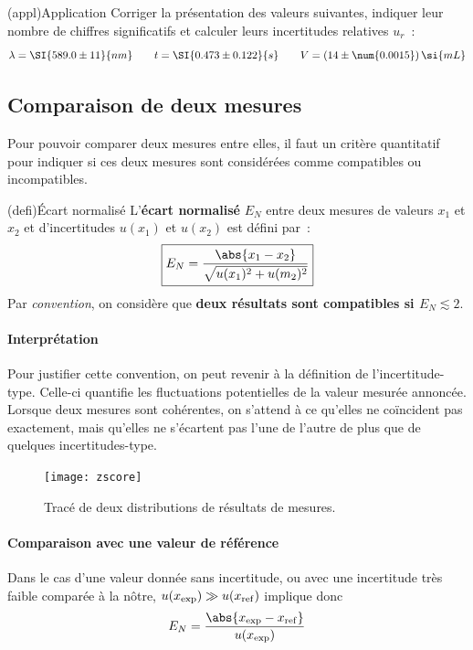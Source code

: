 \documentclass[../main/main.tex]{subfiles}
\begin{document}
\begin{tcb}(appl){Application}
	Corriger la présentation des valeurs suivantes, indiquer leur nombre de
	chiffres significatifs et calculer leurs incertitudes relatives $u_r$~:
	\[
		\lambda = \SI{589.0\pm11}{nm}
		\qquad
		t = \SI{0.473 \pm 0.122}{s}
		\qquad
		V = (14 \pm \num{0.0015})\,\si{mL}
	\]
	\tcblower
\end{tcb}

\subsection{Comparaison de deux mesures}
Pour pouvoir comparer deux mesures entre elles, il faut un critère quantitatif
pour indiquer si ces deux mesures sont considérées comme compatibles ou
incompatibles.
\begin{tcb}(defi){Écart normalisé}
	L'\textbf{écart normalisé} $E_N$ entre deux mesures de valeurs $x_1$ et $x_2$ et d'incertitudes
	$u(x_1)$ et $u(x_2)$ est défini par~:
	\[
		\boxed{E_N = \frac{\abs{x_1-x_2}}{\sqrt{u(x_1)^{2} + u(m_2)^{2}}}}
	\]
	Par \textit{convention}, on considère que \textbf{deux résultats sont
		compatibles si $E_N \lesssim 2$}.
\end{tcb}

\paragraph*{Interprétation}
Pour justifier cette convention, on peut revenir à la définition de
l'incertitude-type. Celle-ci quantifie les fluctuations potentielles de la
valeur mesurée annoncée. Lorsque deux mesures sont cohérentes, on s'attend à ce
qu'elles ne coïncident pas exactement, mais qu'elles ne s'écartent pas l'une de
l'autre de plus que de quelques incertitudes-type.

\begin{figure}[htbp]
	\centering
	\texttt{[image: zscore]}
	\caption{Tracé de deux distributions de résultats de mesures.}
	\label{fig:zscore}
\end{figure}

\paragraph*{Comparaison avec une valeur de référence}
Dans le cas d'une valeur donnée sans incertitude, ou avec une incertitude
très faible comparée à la nôtre, $u(x_{\rm exp}) \gg u(x_{\rm ref})$ implique
donc
\[
	E_N = \frac{\abs{x_{\rm exp} - x_{\rm ref}}}{u(x_{\rm exp})}
\]
\end{document}
